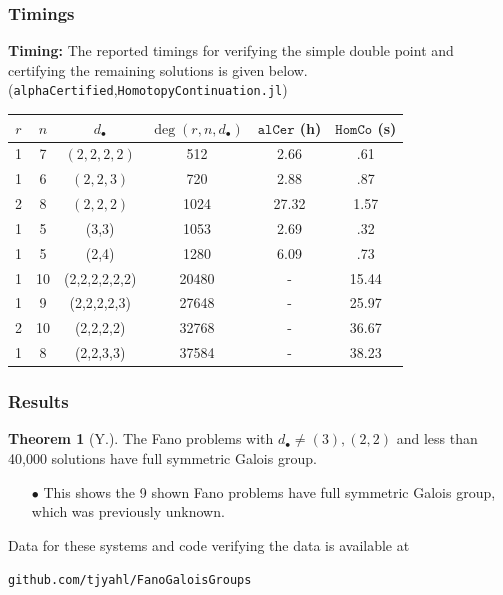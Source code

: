 \documentclass{beamer}
\theoremstyle{definition}
\newtheorem{thm}{Theorem}
\begin{document}
\begin{frame}
\frametitle{Timings}
\textbf{Timing:} The reported timings for verifying the simple double point and certifying the remaining solutions is given below. (\texttt{alphaCertified},\texttt{HomotopyContinuation.jl})
\vspace{-.1cm}
\hspace{-.2cm}
\begin{minipage}{.99\textwidth}
\begin{table}[htb]
  \label{Small Fano}
  \def\arraystretch{.97}
  \begin{tabular}{||c|c|c|c|c|c||}
    \hline
    $r$ & $n$ & $d_\bullet$ & $\deg(r,n,d_\bullet)$ & $\texttt{alCer}$ (h) & $\texttt{HomCo}$ (s)\\
    \hline\hline
    1 & 7 & $(2,2,2,2)$ & 512 & 2.66 & .61\\
    \hline
    1 & 6 & $(2,2,3)$ & 720  & 2.88 & .87\\
    \hline
    2 & 8 & $(2,2,2)$ & 1024 & 27.32 & 1.57\\
    \hline
    1 & 5 & (3,3) & 1053 & 2.69 & .32\\
    \hline
    1 & 5 & (2,4) & 1280 & 6.09 & .73\\
    \hline
    1 & 10 & (2,2,2,2,2,2) & 20480 & - & 15.44\\
    \hline
    1 & 9 & (2,2,2,2,3) & 27648 & - & 25.97\\
    \hline
    2 & 10 & (2,2,2,2) & 32768 & - & 36.67\\
    \hline
    1 & 8 & (2,2,3,3) & 37584 & - & 38.23\\
    \hline
  \end{tabular}
\end{table}
\end{minipage}
\end{frame}




\begin{frame}
\frametitle{Results}
\begin{thm}[Y.]
\vspace{.01cm}
The Fano problems with $d_\bullet\ne (3),(2,2)$ and less than 40,000 solutions have full symmetric Galois group.
\end{thm}

\begin{enumerate}
\item[$\bullet$] This shows the 9 shown Fano problems have full symmetric Galois group, which was previously unknown.
\end{enumerate}

Data for these systems and code verifying the data is available at 
\vspace{-.25cm}
\begin{center}
\texttt{github.com/tjyahl/FanoGaloisGroups}
\end{center}
\end{frame}
\end{document}
